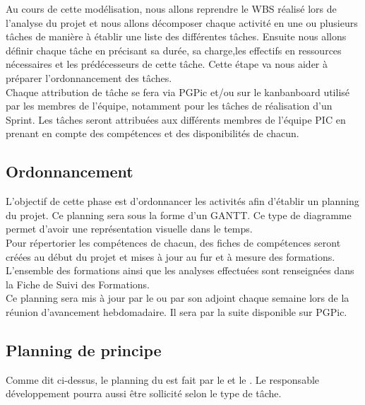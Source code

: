 Au cours de cette modélisation, nous allons reprendre le WBS réalisé lors de l’analyse du projet et nous allons décomposer chaque activité en une ou plusieurs tâches de manière à établir une liste des différentes tâches. Ensuite nous allons définir chaque tâche en précisant sa durée, sa charge,les effectifs en ressources nécessaires et les prédécesseurs de cette tâche. Cette étape va nous aider à préparer l’ordonnancement des tâches.\\

Chaque attribution de tâche se fera via PGPic et/ou sur le kanbanboard utilisé par les membres de l'équipe, notamment pour les tâches de réalisation d’un Sprint. Les tâches seront attribuées aux différents membres de l’équipe PIC en prenant en compte des compétences et des disponibilités de chacun.

\subsection{Ordonnancement}

L'objectif de cette phase est d'ordonnancer les activités afin d'établir un planning du projet. Ce planning sera sous la forme d'un GANTT. Ce type de diagramme permet d’avoir une représentation visuelle dans le temps.\\

Pour répertorier les compétences de chacun, des fiches de compétences seront créées au début du projet et mises à jour au fur et à mesure des formations. L’ensemble des formations ainsi que les analyses effectuées sont renseignées dans la Fiche de Suivi des Formations.\\ 

Ce planning sera mis à jour par le \CP ou par son adjoint chaque semaine lors de la réunion d’avancement hebdomadaire. Il sera par la suite disponible sur PGPic.


\subsection{Planning de principe}

Comme dit ci-dessus, le planning du \PICCourt est fait par le \CP et le \CPA. Le responsable développement pourra aussi être sollicité selon le type de tâche.

%


